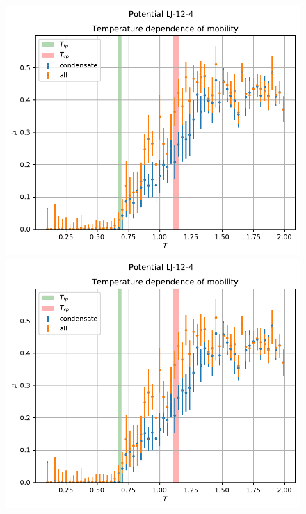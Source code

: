 \documentclass[pdf,hyperref={unicode}]{beamer}
\begin{document}
\begin{frame}
\transdissolve[duration=0.2]

\begin{figure}[h]
\begin{center}
\begin{minipage}[h]{0.35\linewidth}
\includegraphics[width=\textwidth, keepaspectratio]{plot_mobility_Potential LJ-12-4_1}
\end{minipage}
\begin{minipage}[h]{0.35\linewidth}
\includegraphics[width=\textwidth, keepaspectratio]{plot_mobility_Potential LJ-12-4_1}

\end{minipage}
\end{center}
\end{figure}
\end{frame}
\end{document}
